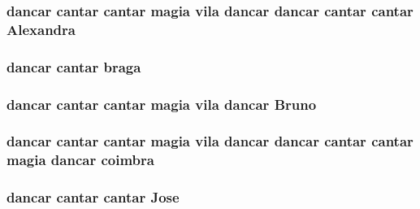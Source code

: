 \subsubsection[{\texorpdfstring{Alexandra}{Alexandra}}]{ {\bf dancar} {\bf cantar} {\bf cantar} {\bf magia} vila {\bf dancar} {\bf dancar} {\bf cantar} {\bf cantar} Alexandra}\hypertarget{jurados_8txt_a75c689fe94e8e128c28b3115dcb1c08e}{}\label{jurados_8txt_a75c689fe94e8e128c28b3115dcb1c08e}
\subsubsection[{\texorpdfstring{braga}{braga}}]{ {\bf dancar} {\bf cantar} braga}\hypertarget{jurados_8txt_acb9307bae8c337dfbd877babfe36f1ad}{}\label{jurados_8txt_acb9307bae8c337dfbd877babfe36f1ad}
\subsubsection[{\texorpdfstring{Bruno}{Bruno}}]{ {\bf dancar} {\bf cantar} {\bf cantar} {\bf magia} vila {\bf dancar} Bruno}\hypertarget{jurados_8txt_ad6d47735fc544be4139037eb78a70b69}{}\label{jurados_8txt_ad6d47735fc544be4139037eb78a70b69}
\subsubsection[{\texorpdfstring{coimbra}{coimbra}}]{ {\bf dancar} {\bf cantar} {\bf cantar} {\bf magia} vila {\bf dancar} {\bf dancar} {\bf cantar} {\bf cantar} {\bf magia} {\bf dancar} coimbra}\hypertarget{jurados_8txt_a7ecd39aca4790a6fae219c51626ebb43}{}\label{jurados_8txt_a7ecd39aca4790a6fae219c51626ebb43}
\subsubsection[{\texorpdfstring{Jose}{Jose}}]{ {\bf dancar} {\bf cantar} {\bf cantar} Jose}\hypertarget{jurados_8txt_ab580858c63900240ff0ab5fcc967078b}{}\label{jurados_8txt_ab580858c63900240ff0ab5fcc967078b}
